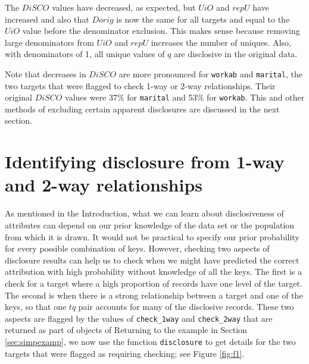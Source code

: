 \documentclass[12pt]{article}
\renewcommand{\baselinestretch}{1.5} %
\begin{document}
The $DiSCO$ values have decreased, as expected, but $UiO$ and $repU$
have increased and also that $Dorig$ is now the same for all targets and equal to the $UiO$ value before the denominator exclusion. This makes sense because 
removing large denominators from $UiO$ and $repU$ increases the number of uniques. Also, with denominators of 1, all unique values of $q$ are disclosive in the original data.

Note that decreases in $DiSCO$ are more pronounced
for \texttt{workab} and \texttt{marital}, the two targets that were flagged to check 1-way or 
2-way relationships. Their original $DiSCO$ values were 37\% for \texttt{marital} and 53\%
for \texttt{workab}. This and other methods of excluding certain apparent disclosures 
are discussed in the next section.

 
 \section{Identifying disclosure from 1-way and 2-way relationships}\label{sec:onetwoway}
As mentioned in the Introduction, what we can learn about disclosiveness of attributes can depend on our prior knowledge of the data set or the population from which it is drawn. It would not be practical to specify our prior probability for every possible combination of keys. However, checking two aspects
of disclosure results can help us to check when we might have predicted the correct attribution with high probability without knowledge of all the keys.
The first is a check for a target where a high proportion of records have one level of the target. The second is when there is a strong relationship
between a target and one of the keys, so that one $tq$ pair accounts for many of the disclosive records. These two aspects are flagged by the
values of \texttt{check\_1way} and \texttt{check\_2way} that are returned as part of objects of 
Returning to the example in Section \ref{sec:simpexamp}, we now use the function \texttt{disclosure} 
to get details for the two targets that were flagged as requiring checking; see Figure \ref{fig:f1}. 
\renewcommand{\baselinestretch}{1.0}
\end{document}
